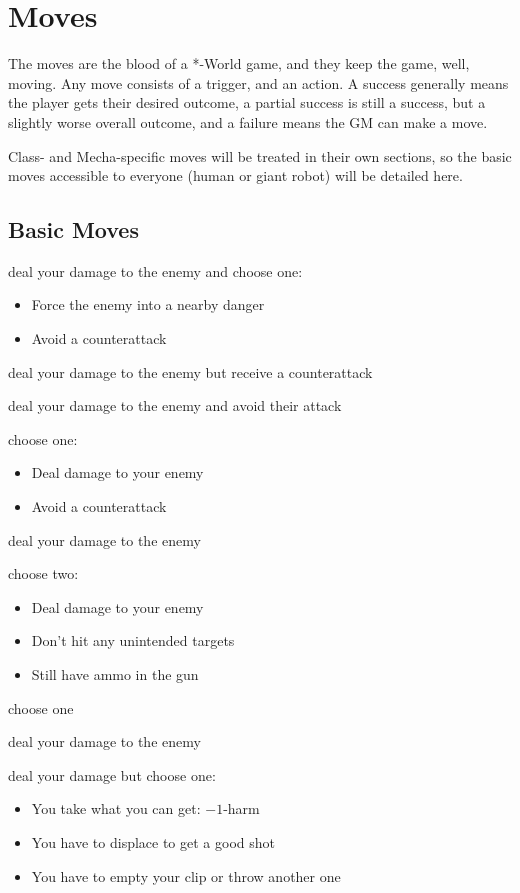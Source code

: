 \section{Moves}
The moves are the blood of a *-World game, and they keep the game, well, moving. Any move consists of a trigger, and an action. A success generally means the player gets their desired outcome, a partial success is still a success, but a slightly worse overall outcome, and a failure means the GM can make a move.

Class- and Mecha-specific moves will be treated in their own sections, so the basic moves accessible to everyone (human or giant robot) will be detailed here.

\subsection{Basic Moves}

{deal your damage to the enemy and choose one:
\begin{itemize}
\item Force the enemy into a nearby danger
\item Avoid a counterattack
\end{itemize}}
{deal your damage to the enemy but receive a counterattack}

{deal your damage to the enemy and avoid their attack}
{choose one:
\begin{itemize}
\item Deal damage to your enemy
\item Avoid a counterattack
\end{itemize}}

{deal your damage to the enemy}
{choose two:
\begin{itemize}
\item Deal damage to your enemy
\item Don't hit any unintended targets
\item Still have ammo in the gun
\end{itemize}}
{choose one}

{deal your damage to the enemy}
{deal your damage but choose one:
\begin{itemize}
\item You take what you can get: $-1$-harm
\item You have to displace to get a good shot
\item You have to empty your clip or throw another one
\end{itemize}}

